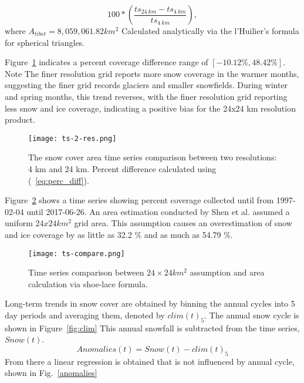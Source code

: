 \begin{equation}\label{eq:perc_diff}
100 * \left( \frac{ts_{24\ km} - ts_{4\ km}}{ts_{4\ km}} \right),
\end{equation}
where $A_{tibet}= 8,059,061.82 km^{2}$ Calculated analytically via the l'Huilier's formula for spherical triangles.

Figure~\ref{compare_times_series} indicates a percent coverage difference range of $[-10.12 \%, 48.42 \%]$. Note The finer resolution grid reports more snow coverage in the warmer months, suggesting the finer grid records glaciers and smaller snowfields. During winter and spring months, this trend reverses, with the finer resolution grid reporting less snow and ice coverage, indicating a positive bias for the 24x24 km resolution product. 

\begin{figure}[ht]
\centering
\begin{minipage}{6in}
\texttt{[image: ts-2-res.png]}
\caption{The snow cover area time series comparison between two resolutions: 4 km and 24 km. Percent difference calculated using (~\ref{eq:perc_diff}).}
\label{compare_times_series}
\end{minipage}
\end{figure}
Figure~\ref{compare_area_methods} shows a time series showing percent coverage collected until from 1997-02-04 until 2017-06-26. An area estimation conducted by Shen et al. \cite{shen2015TPSC} assumed a uniform $24x24 km^{2}$ grid area. This assumption causes an overestimation of snow and ice coverage by as little as 32.2 \% and as much as 54.79 \%.

\begin{figure}[ht]
\centering
\begin{minipage}{6in}
\texttt{[image: ts-compare.png]}
\caption{Time series comparison between $24\times 24 km^{2}$ assumption and area calculation via shoe-lace formula.}
\label{compare_area_methods}
\end{minipage}
\end{figure}

Long-term trends in snow cover are obtained by binning the annual cycles into 5 day periods and averaging them, denoted by $clim(t)_{5}$. The annual snow cycle is shown in Figure~\ref{fig:clim} This annual snowfall is subtracted from the time series, $Snow(t)$.
\begin{equation}
Anomalies(t) = Snow(t)-clim(t)_{5}
\end{equation}
From there a linear regression is obtained that is not influenced by annual cycle, shown in Fig.~\ref{anomalies}

